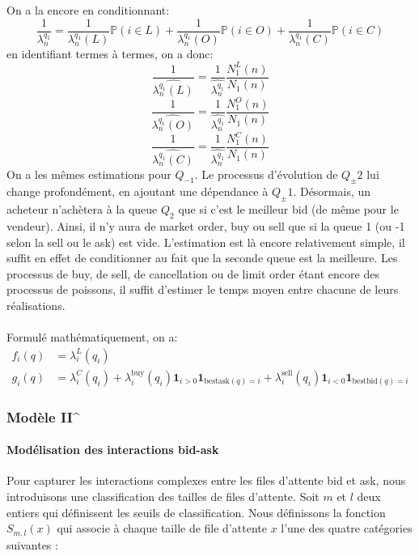 \documentclass[12pt,a4paper]{article}
\theoremstyle{definition}
\theoremstyle{remark}
\begin{document}
    On a la encore en conditionnant:
    $$\frac{1}{{\lambda^{q_1}_n}}=\frac{1}{{\lambda^{q_1}_n(L)}}\mathbb{P}(i\in L)+\frac{1}{{\lambda^{q_1}_n(O)}}\mathbb{P}(i\in O)+\frac{1}{{\lambda^{q_1}_n(C)}}\mathbb{P}(i\in C)$$
    en identifiant termes à termes, on a donc:
    $$\frac{1}{\hat{\lambda^{q_1}_n(L)}}=\frac{1}{\hat{\lambda^{q_1}_n}}\frac{N_1^L(n)}{N_1(n)}$$
    $$\frac{1}{\hat{\lambda^{q_1}_n(O)}}=\frac{1}{\hat{\lambda^{q_1}_n}}\frac{N_1^O(n)}{N_1(n)}$$
    $$\frac{1}{\hat{\lambda^{q_1}_n(C)}}=\frac{1}{\hat{\lambda^{q_1}_n}}\frac{N_1^C(n)}{N_1(n)}$$
    On a les mêmes estimations pour $Q_{-1}$.
    Le processus d'évolution de $Q_\pm2$ lui change profondément, en ajoutant une dépendance à $Q_\pm1$.
    Désormais, un acheteur n’achètera à la queue $Q_2$ que si c'est le meilleur bid (de même pour le vendeur). Ainsi, il n'y aura de market order, buy ou sell que si la queue 1 (ou -1 selon la sell ou le ask) est vide. 
    L'estimation est là encore relativement simple, il suffit en effet de conditionner au fait que la seconde queue est la meilleure. Les processus de buy, de sell, de cancellation ou de limit order étant encore des processus de poissons, il suffit d'estimer le temps moyen entre chacune de leurs réalisations.
    \\
    \\
    Formulé mathématiquement, on a:
    $$\begin{aligned}
    f_i(q) &= \lambda_i^L(q_i)\\
    g_i(q) &= \lambda_i^C(q_i)+\lambda_i^{\text{buy}}(q_i)\textbf{1}_{i>0}\textbf{1}_{\text{bestask}(q)=i}+\lambda_i^{\text{sell}}(q_i)\textbf{1}_{i<0}\textbf{1}_{\text{bestbid}(q)=i}
    \end{aligned}$$

    \subsubsection{Modèle II^{}}

    \paragraph{Modélisation des interactions bid-ask}
    Pour capturer les interactions complexes entre les files d'attente bid et ask, nous introduisons une classification des tailles de files d'attente. Soit $m$ et $l$ deux entiers qui définissent les seuils de classification. Nous définissons la fonction $S_{m,l}(x)$ qui associe à chaque taille de file d'attente $x$ l'une des quatre catégories suivantes :
\end{document}
